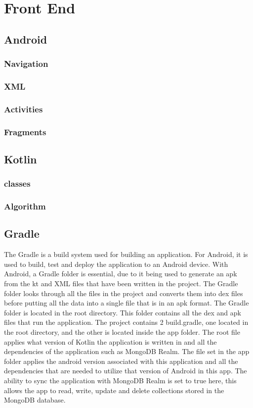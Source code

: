 \section{Front End}
\subsection{Android}
\subsubsection{Navigation}
\subsubsection{XML}
\subsubsection{Activities}
\subsubsection{Fragments}
\subsection{Kotlin}
\subsubsection{classes}
\subsubsection{Algorithm}
\subsection{Gradle}
The Gradle is a build system used for building an application. For Android, it is used to build, test and deploy the application to an Android device.
\newline \newline
With Android, a Gradle folder is essential, due to it being used to generate an apk from the kt and XML files that have been written in the project. The Gradle folder looks through all the files in the project and converts them into dex files before putting all the data into a single file that is in an apk format.
\newline \newline
The Gradle folder is located in the root directory. This folder contains all the dex and apk files that run the application. The project contains 2 build.gradle, one located in the root directory, and the other is located inside the app folder. The root file applies what version of Kotlin the application is written in and all the dependencies of the application such as MongoDB Realm. \newline \newline
The file set in the app folder applies the android version associated with this application and all the dependencies that are needed to utilize that version of Android in this app. The ability to sync the application with MongoDB Realm is set to true here, this allows the app to read, write, update and delete collections stored in the MongoDB database.

